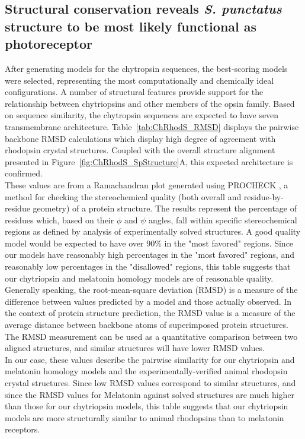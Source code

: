 \subsection*{Structural conservation reveals \textit{S. punctatus} structure to be most likely functional as photoreceptor}
\indent After generating models for the chytropsin sequences, the best-scoring models were selected, representing the most computationally and chemically ideal configurations. A number of structural features provide support for the relationship between chytriopsins and other members of the opsin family. Based on sequence similarity, the chytropsin sequences are expected to have seven transmembrane architecture. Table~\ref{tab:ChRhodS_RMSD} displays the pairwise backbone RMSD calculations which display high degree of agreement with rhodopsin crystal structures. Coupled with the overall structure alignment presented in Figure~\ref{fig:ChRhodS_SpStructure}A, this expected architecture is confirmed. \\
\indent These values are from a Ramachandran plot \cite{Ramachandran1963} generated using PROCHECK \cite{Laskowski1993}, a method for checking the stereochemical quality (both overall and residue-by-residue geometry) of a protein structure. The results represent the percentage of residues which, based on their $\phi$ and $\psi$ angles, fall within specific stereochemical regions as defined by analysis of experimentally solved structures. A good quality model would be expected to have over 90\% in the "most favored" regions. Since our models have reasonably high percentages in the "most favored" regions, and reasonably low percentages in the "disallowed" regions, this table suggests that our chytriopsin and melatonin homology models are of reasonable quality.\\
\indent Generally speaking, the root-mean-square deviation (RMSD) is a measure of the difference between values predicted by a model and those actually observed. In the context of protein structure prediction, the RMSD value is a measure of the average distance between backbone atoms of superimposed protein structures. The RMSD measurement can be used as a quantitative comparison between two aligned structures, and similar structures will have lower RMSD values. \\
\indent In our case, these values describe the pairwise similarity for our chytriopsin and melatonin homology models and the experimentally-verified animal rhodopsin crystal structures. Since low RMSD values correspond to similar structures, and since the RMSD values for Melatonin against solved structures are much higher than those for our chytriopsin models, this table suggests that our chytriopsin models are more structurally similar to animal rhodopsins than to melatonin receptors.\\
